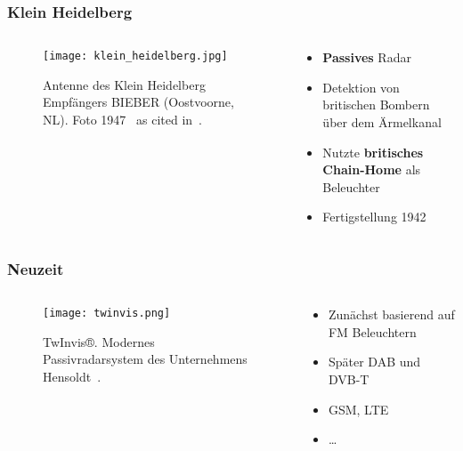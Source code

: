 \begin{frame}
    \frametitle{Klein Heidelberg}

    \begin{columns}
        \begin{column}{0.44\textwidth}
            \begin{figure}
                \centering
                \texttt{[image: klein\_heidelberg.jpg]}
                \caption{Antenne des Klein Heidelberg Empfängers BIEBER (Oostvoorne, NL). Foto 1947~\cite{Rijpsma2005} as cited in~\cite{Griffiths2010}.}
            \end{figure}
        \end{column}
        \begin{column}{0.56\textwidth}
            \begin{itemize}
                \item \textbf{Passives} Radar
                \item Detektion von britischen Bombern über dem Ärmelkanal
                \item Nutzte \textbf{britisches Chain-Home} als Beleuchter
                \item Fertigstellung 1942
            \end{itemize}
        \end{column}
    \end{columns}
\end{frame}

\begin{frame}
    \frametitle{Neuzeit}

    \begin{columns}
        \begin{column}{0.55\textwidth}
            \begin{figure}
                \centering
                \texttt{[image: twinvis.png]}
                \caption{TwInvis®. Modernes Passivradarsystem des Unternehmens Hensoldt~\cite{Hensoldt2019}.}
            \end{figure}
        \end{column}
        \begin{column}{0.45\textwidth}
            \begin{itemize}
                \item Zunächst basierend auf FM Beleuchtern
                \item Später DAB und DVB-T
                \item GSM, LTE
                \item \dots
            \end{itemize}
        \end{column}
    \end{columns}
\end{frame}

